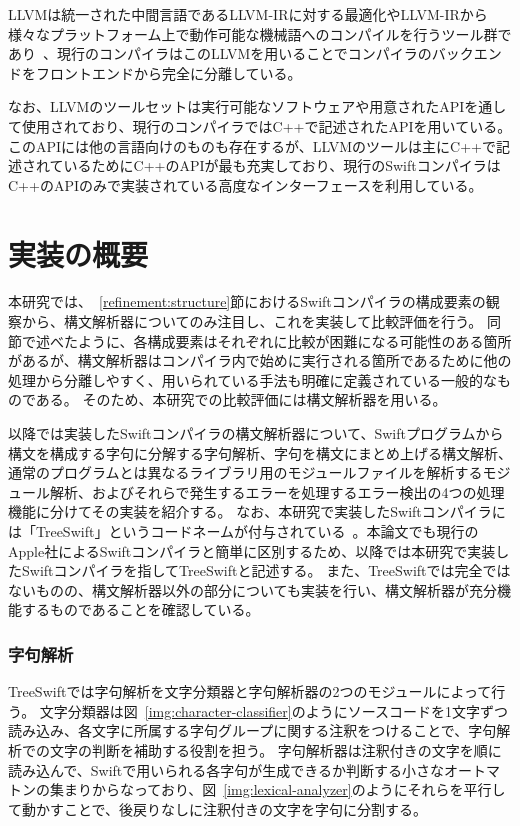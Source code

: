 LLVMは統一された中間言語であるLLVM-IRに対する最適化やLLVM-IRから様々なプラットフォーム上で動作可能な機械語へのコンパイルを行うツール群であり~\cite{llvm}、現行のコンパイラはこのLLVMを用いることでコンパイラのバックエンドをフロントエンドから完全に分離している。

なお、LLVMのツールセットは実行可能なソフトウェアや用意されたAPIを通して使用されており、現行のコンパイラではC++で記述されたAPIを用いている。
このAPIには他の言語向けのものも存在するが、LLVMのツールは主にC++で記述されているためにC++のAPIが最も充実しており、現行のSwiftコンパイラはC++のAPIのみで実装されている高度なインターフェースを利用している。

\section{実装の概要}
\label{implementation:abstract}

本研究では、~\ref{refinement:structure}節におけるSwiftコンパイラの構成要素の観察から、構文解析器についてのみ注目し、これを実装して比較評価を行う。
同節で述べたように、各構成要素はそれぞれに比較が困難になる可能性のある箇所があるが、構文解析器はコンパイラ内で始めに実行される箇所であるために他の処理から分離しやすく、用いられている手法も明確に定義されている一般的なものである。
そのため、本研究での比較評価には構文解析器を用いる。

以降では実装したSwiftコンパイラの構文解析器について、Swiftプログラムから構文を構成する字句に分解する字句解析、字句を構文にまとめ上げる構文解析、通常のプログラムとは異なるライブラリ用のモジュールファイルを解析するモジュール解析、およびそれらで発生するエラーを処理するエラー検出の4つの処理機能に分けてその実装を紹介する。
なお、本研究で実装したSwiftコンパイラには「TreeSwift」というコードネームが付与されている~\cite{treeswift}。本論文でも現行のApple社によるSwiftコンパイラと簡単に区別するため、以降では本研究で実装したSwiftコンパイラを指してTreeSwiftと記述する。
また、TreeSwiftでは完全ではないものの、構文解析器以外の部分についても実装を行い、構文解析器が充分機能するものであることを確認している。

\subsubsection{字句解析}

TreeSwiftでは字句解析を文字分類器と字句解析器の2つのモジュールによって行う。
文字分類器は図~\ref{img:character-classifier}のようにソースコードを1文字ずつ読み込み、各文字に所属する字句グループに関する注釈をつけることで、字句解析での文字の判断を補助する役割を担う。
字句解析器は注釈付きの文字を順に読み込んで、Swiftで用いられる各字句が生成できるか判断する小さなオートマトンの集まりからなっており、図~\ref{img:lexical-analyzer}のようにそれらを平行して動かすことで、後戻りなしに注釈付きの文字を字句に分割する。

